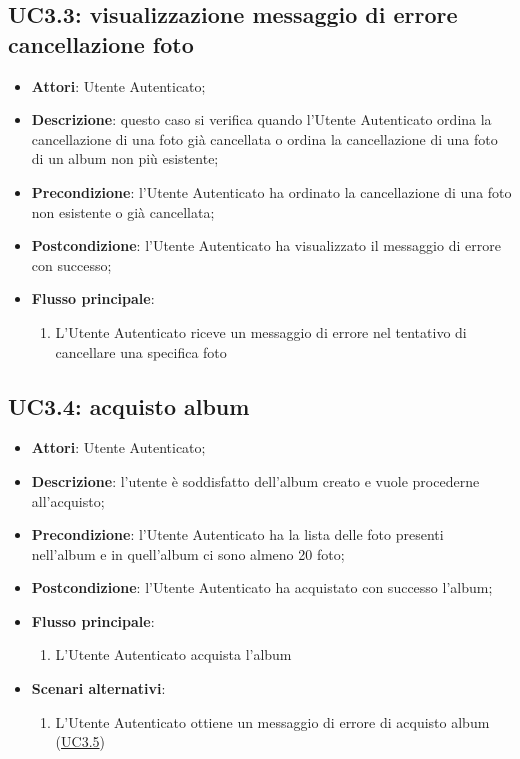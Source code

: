 
\subsection{UC3.3: visualizzazione messaggio di errore cancellazione foto}
\label{uc:uc3.3}
\hypertarget{UC3.3}{}

\begin{itemize}
  \item \textbf{Attori}: Utente Autenticato;
  \item \textbf{Descrizione}: questo caso si verifica quando l'Utente
Autenticato ordina la cancellazione di una foto già cancellata o ordina la
cancellazione di una foto di un album non più esistente;
  \item \textbf{Precondizione}: l'Utente Autenticato ha ordinato la
cancellazione di una foto non esistente o già cancellata;
  \item \textbf{Postcondizione}: l'Utente Autenticato ha visualizzato il
messaggio di errore con successo;
  \item \textbf{Flusso principale}:
  \begin{enumerate}
    \item L'Utente Autenticato riceve un messaggio di errore nel tentativo di
cancellare una specifica foto
  \end{enumerate}
\end{itemize}



\subsection{UC3.4: acquisto album}
\label{uc:uc3.4}
\hypertarget{UC3.4}{}

\begin{itemize}
  \item \textbf{Attori}: Utente Autenticato;
  \item \textbf{Descrizione}: l'utente è soddisfatto dell'album creato e vuole
procederne all'acquisto;
  \item \textbf{Precondizione}: l'Utente Autenticato ha la lista delle foto
presenti nell'album e in quell'album ci sono almeno 20 foto;
  \item \textbf{Postcondizione}: l'Utente Autenticato ha acquistato con
successo l'album;
  \item \textbf{Flusso principale}:
  \begin{enumerate}
    \item L'Utente Autenticato acquista l'album
  \end{enumerate}
  \item \textbf{Scenari alternativi}:
  \begin{enumerate}
    \item L'Utente Autenticato ottiene un messaggio di errore di acquisto album
(\hyperlink{UC3.5}{UC3.5})
  \end{enumerate}
\end{itemize}

